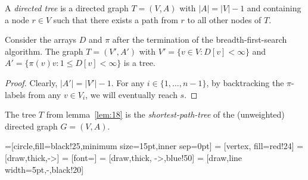 \begin{definition}
  \label{def:t6}
  A \emph{directed  tree} is a directed graph $T = (V,A)$ with 
  $|A| = |V| -1$ and containing a node $r \in V$ such that there 
  exists a path from $r$ to all other nodes of $T$. 
\end{definition}



\begin{lemma}
  \label{lem:18}
  Consider the arrays $D$ and $\pi$ after the termination of the
  breadth-first-search algorithm. 
  The graph $T = (V',A')$ with $V' = \{v \in V \colon D[v]<\infty\}$ and $A' =
  \{ \pi(v) v \colon 1\leq D[v]<\infty\}$ is a tree. 
\end{lemma}


\begin{proof}
  Clearly, $|A'| = |V'| -1$. For any $i \in \{1,\ldots,n-1\}$, by
  backtracking the $\pi$-labels from any $v \in V_i$, we will eventually
  reach $s$.
\end{proof}

\begin{definition}
  \label{def:t7}
  The tree $T$ from lemma~\ref{lem:18} is the \emph{shortest-path-tree}
   of the (unweighted) directed graph $G = (V,A)$. 
\end{definition}



  =[circle,fill=black!25,minimum size=15pt,inner sep=0pt]
   = [vertex, fill=red!24]
   = [draw,thick,->]
   = [font=\small]
   = [draw,thick, ->,blue!50]
   = [draw,line width=5pt,-,black!20]


